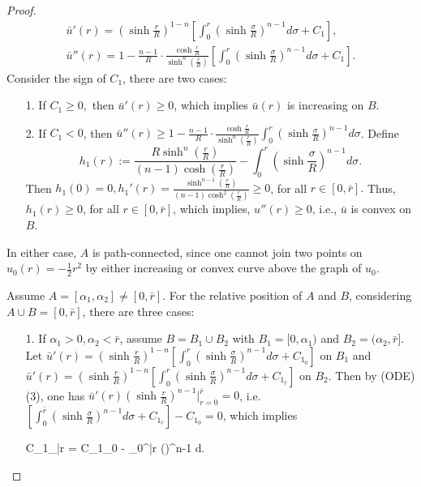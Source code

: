 \begin{proof}
\begin{align*}
	\bar{u}'(r) = \left(\sinh\frac{r}{R}\right)^{1-n} \left[\int_{0}^{r} \left(\sinh\frac{\sigma }{R}\right)^{n-1} d\sigma  +C_1\right],\\
	\bar{u}''(r) = 1-\frac{n-1}{R}\cdot \frac{\cosh \frac{r}{R}}{\sinh^n(\frac{r}{R})} \left[ \int_{0}^{r} \left(\sinh\frac{\sigma }{R}\right)^{n-1} d\sigma +C_1 \right].
	\end{align*}
	Consider the sign of $C_1$, there are two cases:
	\begin{itemize}
		\item[1.]  If $C_1 \ge 0,$ then $\bar{u}'(r)\ge 0$, which implies $\bar{u}(r)$ is increasing on $B$.
		\item[2.] If $C_1<0$, then $\bar{u}''(r)\ge 1-\frac{n-1}{R}\cdot \frac{\cosh \frac{r}{R}}{\sinh^n(\frac{r}{R})}\int_{0}^{r} (\sinh\frac{\sigma }{R})^{n-1} d\sigma $. Define 
		$$h_1(r):= \frac{R\sinh^n(\frac{r}{R})}{(n-1)\cosh(\frac{r}{R})} - \int_{0}^{r} \left(\sinh\frac{\sigma }{R}\right)^{n-1} d\sigma.$$ 
		Then $h_1(0)=0, h_1'(r) = \frac{\sinh^{n-1}(\frac{r}{R})}{(n-1)\cosh^2(\frac{r}{R})}\ge 0$, for all $r\in [0, \bar{r}].$ Thus, $h_1(r) \ge 0$, for all $r\in [0, \bar{r}]$, which implies, $u''(r)\ge 0$, i.e., $\bar{u}$ is convex on $B$.
	\end{itemize}
	
	In either case, $A$ is path-connected, since one cannot join two points on $u_{0}(r) = -\frac{1}{2}r^2$ by either increasing or convex curve above the graph of $u_{0}$.
	
	Assume $A=[\alpha_1, \alpha_2] \neq [0, \bar{r}]$. For the relative position of $A$ and $B$, considering $A \cup B =[0,\bar{r}]$, there are three cases:
	\begin{itemize}
		\item [1.] If $\alpha_1>0, \alpha_2<\bar{r}$, assume $B = B_1 \cup B_2$ with $B_1 = [0, \alpha_1)$ and $B_2 = (\alpha_2, \bar{r}]$. Let $	\bar{u}'(r) = (\sinh\frac{r}{R})^{1-n} [\int_{0}^{r} (\sinh\frac{\sigma }{R})^{n-1} d\sigma  +C_{1_0}]$ on $B_1$ and 	$\bar{u}'(r) = (\sinh\frac{r}{R})^{1-n} [\int_{0}^{r} (\sinh\frac{\sigma }{R})^{n-1} d\sigma  + C_{1_{\bar{r}}}]$ on $B_2$.
		Then by (ODE)(3), one has $\bar{u}'(r)(\sinh\frac{r}{R})^{n-1}|_{r=0}^{\bar{r}} =0$, i.e. $[\int_{0}^{\bar{r}} (\sinh\frac{\sigma }{R})^{n-1} d\sigma  +C_{1_{\bar{r}}}] - C_{1_0} =0$, which implies 
		\begin{flalign}\label{eqn:constant_C_1}
			C_{1_{\bar{r}}} = C_{1_0} -  \int_{0}^{\bar{r}} \left(\sinh{}\right)^{n-1} d\sigma .
		\end{flalign}
		

\end{itemize}
\end{proof}
